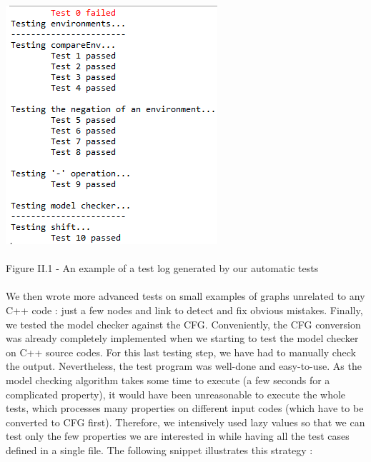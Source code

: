 \documentclass{report}
\begin{document}
\begin{center}
\includegraphics[scale=0.7]{data/test-log}
~\\~\\Figure II.1 - An example of a test log generated by our automatic tests
\end{center}

\paragraph{}
\hspace{4mm}\textnormal{We then wrote more advanced tests on small examples of graphs unrelated to any C++ code : just a few nodes and link to detect and fix obvious mistakes.
Finally, we tested the model checker against the CFG. Conveniently, the CFG conversion was already completely implemented when we starting to test the
model checker on C++ source codes. For this last testing step, we have had to manually check the output. Nevertheless, the test program was well-done and
easy-to-use. As the model checking algorithm takes some time to execute (a few seconds for a complicated property), it would have been unreasonable to execute the whole
tests, which processes many properties on different input codes (which have to be converted to CFG first). Therefore, we intensively used lazy values so that we can
test only the few properties we are interested in while having all the test cases defined in a single file.
The following snippet illustrates this strategy :}
\end{document}
